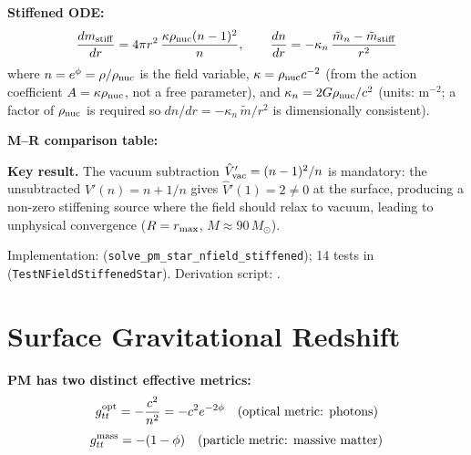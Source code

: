 \documentclass[10pt,twocolumn]{article}
\begin{document}
\textbf{Stiffened ODE:}
\[
  \frac{dm_{\rm stiff}}{dr} = 4\pi r^2\,\frac{\kappa\rho_{\rm nuc}(n-1)^2}{n},
  \qquad
  \frac{dn}{dr} = -\kappa_n\,\frac{\tilde m_n - \tilde m_{\rm stiff}}{r^2}
\]
where $n = e^\phi = \rho/\rho_{\rm nuc}$ is the field variable,
$\kappa=\rho_{\rm nuc}c^{-2}$ (from the action coefficient $A=\kappa\rho_{\rm nuc}$,
not a free parameter), and $\kappa_n=2G\rho_{\rm nuc}/c^2$
(units: $\mathrm{m}^{-2}$; a factor of $\rho_{\rm nuc}$ is required so$\;dn/dr = -\kappa_n\,\tilde{m}/r^2$ is dimensionally consistent).

\textbf{M--R comparison table:}
\begin{center}
\end{center}

\textbf{Key result.} The vacuum subtraction $\hat V'_{\rm vac}=(n-1)^2/n$ is mandatory:
the unsubtracted $\hat V'(n)=n+1/n$ gives $\hat V'(1)=2\neq 0$ at the surface,
producing a non-zero stiffening source where the field should relax to vacuum,
leading to unphysical convergence ($R=r_{\rm max}$, $M\approx 90\,M_\odot$).

Implementation:  (\texttt{solve\_pm\_star\_nfield\_stiffened});
14 tests in  (\texttt{TestNFieldStiffenedStar}).
Derivation script: .

\section{Surface Gravitational Redshift}

\textbf{PM has two distinct effective metrics:}
\[
  g_{tt}^{\rm opt}  = -\frac{c^2}{n^2} = -c^2 e^{-2\phi}
  \quad\text{(optical metric: photons)}
\]
\[
  g_{tt}^{\rm mass} = -(1-\phi)
  \quad\text{(particle metric: massive matter)}
\]
\end{document}
